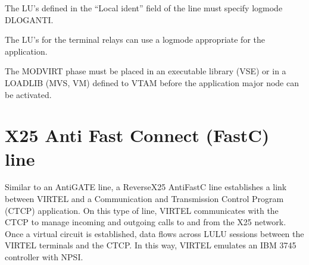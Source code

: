 \documentclass[letterpaper,10pt,english]{sphinxmanual}
\begin{document}
\begin{sphinxVerbatim}[commandchars=\\\{\}]
  
  
  
  
\end{sphinxVerbatim}

\sphinxAtStartPar
{}
\begin{description}
\sphinxAtStartPar
The LU’s defined in the “Local ident” field of the line must specify logmode DLOGANTI.

\sphinxAtStartPar
The LU’s for the terminal relays can use a logmode appropriate for the application.

\sphinxAtStartPar
The MODVIRT phase must be placed in an executable library (VSE) or in a LOADLIB (MVS, VM) defined to VTAM before the application major node can be activated.

\end{description}

\newpage

\ignorespaces 

\section{X25 Anti Fast Connect (FastC) line}
\label{\detokenize{connectivity_guide:x25-anti-fast-connect-fastc-line}}\label{\detokenize{connectivity_guide:index-78}}
\sphinxAtStartPar
Similar to an AntiGATE line, a Reverse\sphinxhyphen{}X25 AntiFastC line establishes a link between VIRTEL and a Communication and Transmission Control Program (CTCP) application. On this type of   line, VIRTEL communicates with the CTCP to manage incoming and outgoing calls to and from the X25 network. Once a virtual circuit is established, data flows across LU\sphinxhyphen{}LU sessions between the VIRTEL terminals and the CTCP. In this way, VIRTEL emulates an IBM 3745 controller with NPSI.
\end{document}
